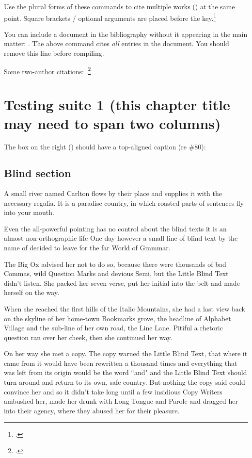 \documentclass{grattan}
\begin{document}
Use the plural forms of these commands to cite multiple works (\textcites{Piketty2013}{Leigh-2013-BattlersBillionaires}) at the same point.
Square brackets / optional arguments are placed before the key.\footcites{AtkinsonStiglitz1976}[][42]{ABS-WagePriceIndex-Jun2017}


You can include a document in the bibliography without it appearing in the main matter: \nocite{*}.
The above command cites \emph{all} entries in the document. 
You should remove this line before compiling. 

Some two-author citations: \textcite{Norton2014Doubtfuldebtrising}.\footcites{DuckettBreadon-2014-Unlocking-skills}{Duckett-2016-Premium-policy-getting-more-from-PBS}{Norton2015Universityfeeswhat}{Norton2015cashnexushow}

\chapter{Testing suite 1 (this chapter title may need to span two columns)}\label{chap:test-1}
The box on the right () should have a top-aligned caption (re \#80):

\section{Blind section}
A small river named Carlton flows by their place and supplies it with the necessary regalia.
It is a paradise country, in which roasted parts of sentences fly into your mouth.

Even the all-powerful pointing has no control about the blind texts it is an almost non-orthographic life One day however a small line of blind text by the name of  decided to leave for the far World of Grammar.

The Big Ox advised her not to do so, because there were thousands of bad Commas, wild Question Marks and devious Semi, but the Little Blind Text didn't listen.
She packed her seven verse, put her initial into the belt and made herself on the way.

When she reached the first hills of the Italic Mountains, she had a last view back on the skyline of her home-town Bookmarks grove, the headline of Alphabet Village and the sub-line of her own road, the Line Lane.
Pitiful a rhetoric question ran over her cheek, then she continued her way.

On her way she met a copy.
The copy warned the Little Blind Text, that where it came from it would have been rewritten a thousand times and everything that was left from its origin would be the word ``and" and the Little Blind Text should turn around and return to its own, safe country.
But nothing the copy said could convince her and so it didn't take long until a few insidious Copy Writers ambushed her, made her drunk with Long Tongue and Parole and dragged her into their agency, where they abused her for their pleasure.
\end{document}

